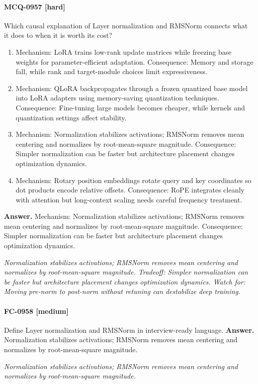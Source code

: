 \paragraph{MCQ-0957 [hard]} Which causal explanation of Layer normalization and RMSNorm connects what it does to when it is worth its cost?
\begin{enumerate}[label=\Alph*.]
\item Mechanism: LoRA trains low-rank update matrices while freezing base weights for parameter-efficient adaptation. Consequence: Memory and storage fall, while rank and target-module choices limit expressiveness.
\item Mechanism: QLoRA backpropagates through a frozen quantized base model into LoRA adapters using memory-saving quantization techniques. Consequence: Fine-tuning large models becomes cheaper, while kernels and quantization settings affect stability.
\item Mechanism: Normalization stabilizes activations; RMSNorm removes mean centering and normalizes by root-mean-square magnitude. Consequence: Simpler normalization can be faster but architecture placement changes optimization dynamics.
\item Mechanism: Rotary position embeddings rotate query and key coordinates so dot products encode relative offsets. Consequence: RoPE integrates cleanly with attention but long-context scaling needs careful frequency treatment.
\end{enumerate}
\noindent\textbf{Answer.} Mechanism: Normalization stabilizes activations; RMSNorm removes mean centering and normalizes by root-mean-square magnitude. Consequence: Simpler normalization can be faster but architecture placement changes optimization dynamics.
\par\textit{Normalization stabilizes activations; RMSNorm removes mean centering and normalizes by root-mean-square magnitude. Tradeoff: Simpler normalization can be faster but architecture placement changes optimization dynamics. Watch for: Moving pre-norm to post-norm without retuning can destabilize deep training.}
\paragraph{FC-0958 [medium]} Define Layer normalization and RMSNorm in interview-ready language.
\noindent\textbf{Answer.} Normalization stabilizes activations; RMSNorm removes mean centering and normalizes by root-mean-square magnitude.
\par\textit{Normalization stabilizes activations; RMSNorm removes mean centering and normalizes by root-mean-square magnitude.}
